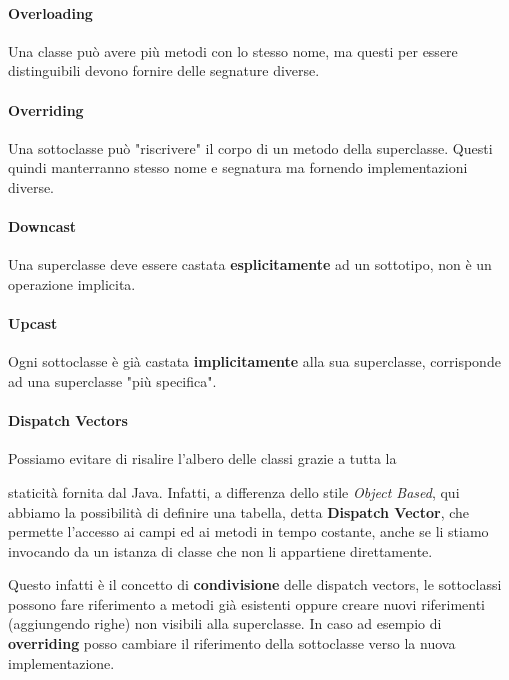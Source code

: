 \documentclass{article}
\begin{document}
\paragraph{Overloading} Una classe può avere più metodi con lo stesso nome, ma questi per essere distinguibili devono fornire delle segnature diverse.

\vspace*{6px}

\paragraph{Overriding} Una sottoclasse può "riscrivere" il corpo di un metodo della superclasse. Questi quindi manterranno stesso nome e segnatura ma fornendo implementazioni diverse.

\vspace*{6px}

\paragraph{Downcast} Una superclasse deve essere castata \textbf{esplicitamente} ad un sottotipo, non è un operazione implicita.

\vspace*{6px}

\paragraph{Upcast} Ogni sottoclasse è già castata \textbf{implicitamente} alla sua superclasse, corrisponde ad una superclasse "più specifica".

\newpage

\paragraph{Dispatch Vectors} Possiamo evitare di risalire l'albero delle classi grazie a tutta la 

staticità fornita dal Java. Infatti, a differenza dello stile \textit{Object Based}, qui abbiamo la possibilità di definire una tabella, detta \textbf{Dispatch Vector}, che permette l'accesso ai campi ed ai metodi in tempo costante, anche se li stiamo invocando da un istanza di classe che non li appartiene direttamente.

Questo infatti è il concetto di \textbf{condivisione} delle dispatch vectors, le sottoclassi possono fare riferimento a metodi già esistenti oppure creare nuovi riferimenti (aggiungendo righe) non visibili alla superclasse. In caso ad esempio di \textbf{overriding} posso cambiare il riferimento della sottoclasse verso la nuova implementazione.
\end{document}
